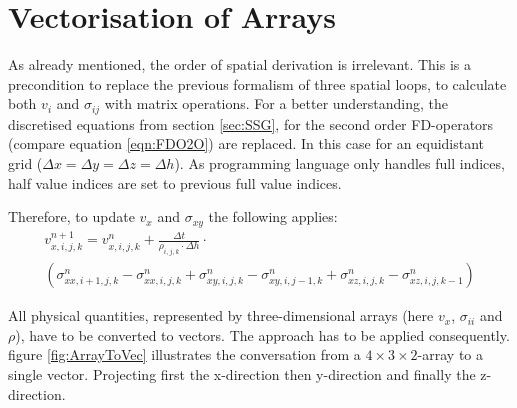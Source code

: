 \documentclass[pdftex,a4paper,parskip,listof=totoc,bibliography=totoc,onehalfspacing,12pt]{scrreprt}
\begin{document}
\section{Vectorisation of Arrays}
As already mentioned, the order of spatial derivation is irrelevant. This is a precondition to replace the previous formalism of three spatial loops, to calculate both $v_i$ and $\sigma_{ij}$ with matrix operations. For a better understanding, the discretised equations from section \ref{sec:SSG}, for the second order FD-operators (compare equation \ref{eqn:FDO2O}) are replaced. In this case for an equidistant grid ($\Delta x = \Delta y = \Delta z = \Delta h$). As programming language only handles full indices, half value indices are set to previous full value indices. 

Therefore, to update $v_x$ and $\sigma_{xy}$  the following applies:
\begin{multline}
	v_{x,i,j,k}^{n+1} = v_{x,i,j,k}^n + \frac{\Delta t}{\rho_{i,j,k} \cdot \Delta h} \cdot\\  \left( \sigma_{xx,i+1,j,k}^{n} - \sigma_{xx,i,j,k}^{n} + \sigma_{xy,i,j,k}^{n} - \sigma_{xy,i,j-1,k}^{n} + \sigma_{xz,i,j,k}^{n} - \sigma_{xz,i,j,k-1}^{n} \right)\label{eqn:exMV1}
\end{multline}

All physical quantities, represented by three-dimensional arrays (here $v_x$, $\sigma_{ii}$ and $\rho$), have to be converted to vectors. The approach has to be applied consequently. figure \ref{fig:ArrayToVec} illustrates the conversation from a $4 \times 3 \times 2$-array to a single vector. Projecting first the x-direction then y-direction and finally the z-direction.
\end{document}
